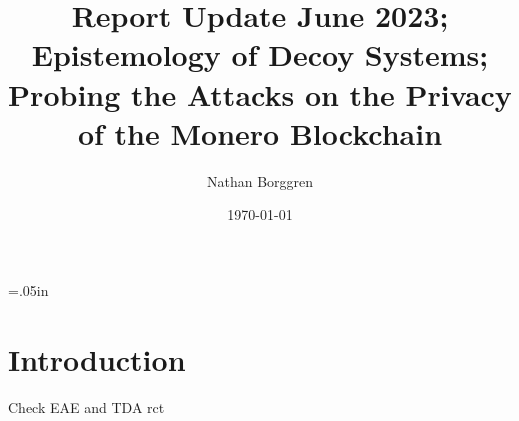 \documentclass[prc, 12pt]{revtex4-1}
\begin{document}
 \topmargin=.05in
 
 \title{Report Update June 2023; Epistemology of Decoy Systems; Probing the Attacks on the Privacy of the Monero Blockchain}
 \author{Nathan Borggren}
 \date{\today}

\begin{abstract}

\end{abstract}

\maketitle{}

\tableofcontents

\section{Introduction}

Check \gls{EAE} and \gls{TDA} \gls{rct}







  
\printnoidxglossaries  



\end{document}
